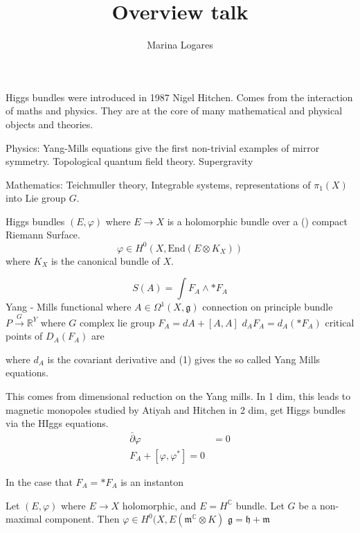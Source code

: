 % 

\title{Overview talk}
\author{Marina Logares}
\date{}

 
\maketitle

Higgs bundles were introduced in 1987 Nigel Hitchen. 
Comes from the interaction of maths and physics. 
They are at the core of many mathematical and physical objects and theories.

Physics: Yang-Mills equations give the first non-trivial examples of mirror symmetry. 
Topological quantum field theory. Supergravity

Mathematics: Teichmuller theory, Integrable systems, 
representations of $ \pi_1 (X) $ into Lie group $G$. 

Higgs bundles
$(E, \varphi) $ where $ E \rightarrow  X $ is a holomorphic bundle over a () 
compact Riemann Surface. 
\begin{equation}
    \varphi \in H^0 ( X, \mathrm{End} (E \otimes K _X) ) 
\end{equation}
where $K_X$ is the canonical bundle of $X$. 

\begin{equation}
    S(A) = \int F_A \wedge * F_A
\end{equation}
Yang - Mills functional where $A \in \Omega^1 (X, \mathfrak{g}) $  connection on principle bundle $ P \xrightarrow{G}  \mathbb{R} ^Y $
where $ G$ complex lie group $ F_A= dA + [A, A] $
$d_A F_A = d_A ( * F_A )$
critical points of $ D_A (F_A) $ are 

where $d_A $ is the covariant derivative and (1) 
gives the so called Yang Mills equations. 

This comes from dimensional reduction on the Yang mills.
In 1 dim, this leads to magnetic monopoles studied by Atiyah and Hitchen
in 2 dim, get Higgs bundles via the HIggs equations. 
\begin{align}
    \bar{\partial} \varphi & = 0 \\
    F_A + [ \varphi , \varphi^* ] = 0 
\end{align}

In the case that $ F_A = * F_A $ is an instanton 

Let $(E,\varphi) $ where $ E \rightarrow  X$ holomorphic, 
and $ E = H^\mathbb{C} $ bundle.
Let $ G$ be a non-maximal component. 
Then $ \varphi \in H ^0 ( X, E(\mathfrak{m}^ \mathbb{C} \otimes K) $
$\mathfrak{g} = \mathfrak{h} + \mathfrak{m} $ 

